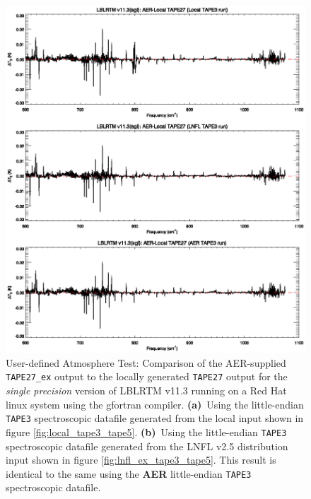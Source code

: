 \begin{figure}[htp]
  \includegraphics[bb=82 313 534 472,clip,scale=1.0]{graphics/run_example_user_defined_upwelling/gfortran/sgl.eps}
  \caption{User-defined Atmosphere Test: Comparison of the AER-supplied \texttt{TAPE27\_ex} output to the locally generated \texttt{TAPE27} output for the \textsl{single precision} version of LBLRTM v11.3 running on a Red Hat linux system using the gfortran compiler. \mbox{\textbf{(a)} Using} the little-endian \texttt{TAPE3} spectroscopic datafile generated from the local input shown in figure \ref{fig:local_tape3_tape5}. \mbox{\textbf{(b)} Using} the little-endian \texttt{TAPE3} spectroscopic datafile generated from the LNFL v2.5 distribution input shown in figure \ref{fig:lnfl_ex_tape3_tape5}. This result is identical to the same using the \textbf{AER} little-endian \texttt{TAPE3} spectroscopic datafile.}
  \label{fig:run_example_user_defined_upwelling-sgl_gfortran}
\end{figure}

